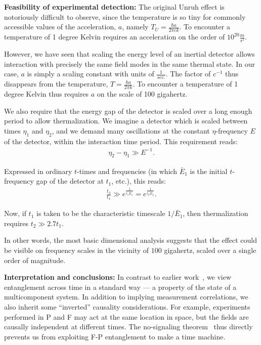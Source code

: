 \documentclass[aps,prl,twocolumn,showpacs]{revtex4}
\begin{document}
\textbf{Feasibility of experimental detection:}  The original Unruh effect is notoriously difficult to observe, since the temperature is so tiny for commonly accessible values of the acceleration, $a$, namely $T_{U} = \frac{\hbar a}{2 \pi c k}$.  To encounter a temperature of 1 degree Kelvin requires an acceleration on the order of $10^{20} \frac{m}{s^{2}}$.

However, we have seen that scaling the energy level of an inertial detector allows interaction with precisely the same field modes in the same thermal state.  In our case, $a$ is simply a scaling constant with units of $\frac{1}{sec.}$.  The factor of $c^{-1}$ thus disappears from the temperature, $T = \frac{\hbar a}{2 \pi k}$.  To encounter a temperature of 1 degree Kelvin thus requires $a$ on the scale of 100 gigahertz.

We also require that the energy gap of the detector is scaled over a long enough period to allow thermalization.  We imagine a detector which is scaled between times $\eta_{1}$ and $\eta_{2}$, and we demand many oscillations at the constant $\eta$-frequency $E$ of the detector, within the interaction time period.  This requirement reads:
\begin{eqnarray*}
\eta_{2} - \eta_{1} \gg E^{-1}.
\end{eqnarray*}

Expressed in ordinary $t$-times and frequencies (in which $\bar{E}_{1}$ is the initial $t$-frequency gap of the detector at $t_{1}$, etc.), this reads:
\begin{eqnarray*}
\frac{t_{2}}{t_{1}} \gg e^{\frac{1}{t_{1} \bar{E}_{1}}} = e^{\frac{1}{t_{2} \bar{E}_{2}}}.
\end{eqnarray*}

Now, if $t_{1}$ is taken to be the characteristic timescale $1/\bar{E}_{1}$, then thermalization requires $t_{2}  \gg 2.7 t_{1}$.

In other words, the most basic dimensional analysis suggests that the effect could be visible on frequency scales in the vicinity of $100$ gigahertz, scaled over a single order of magnitude.

\textbf{Interpretation and conclusions:} In contrast to earlier work~\cite{vedral1}, we view entanglement across time in a standard way \---- a property of the state of a multicomponent system.  In addition to implying measurement correlations, we also inherit some ``inverted'' causality considerations.  For example, experiments performed in P and F may act at the same location in space, but the fields are causally independent at different times.  The no-signaling theorem~\cite{ghirardi1} thus directly prevents us from exploiting F-P entanglement to make a time machine.
\end{document}
